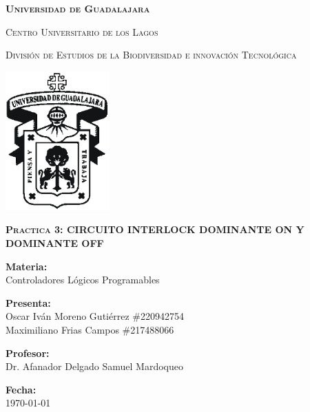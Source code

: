 \documentclass[12pt]{report}
\begin{document}
\setlength{\hoffset}{27 pt} %
\begin{titlepage}
{\centering
{\scshape\bfseries\fontsize{29.16}{34.992}\selectfont Universidad de Guadalajara \par}
\vspace{0.5cm}
{\scshape\Large Centro Universitario de los Lagos \par}
\vspace{1cm}
{\scshape\Large División de Estudios de la Biodiversidad e innovación Tecnológica \par}
\vspace{1cm}
{\graphicspath{{imagenes/Portada}} %
\includegraphics[width=0.3\textwidth]{image.png}\par}
\vspace{1cm}
{\scshape\large\bfseries Practica 3: CIRCUITO INTERLOCK
DOMINANTE ON Y DOMINANTE OFF \par}
\vspace{0.5cm}
{\large \textbf{Materia:} \\Controladores Lógicos Programables\par}
\vfill
{\large \textbf{Presenta:} \\Oscar Iván Moreno Gutiérrez \#220942754
\\Maximiliano Frias Campos \#217488066
\par}
\vfill
{\large \textbf{Profesor:} \\Dr. Afanador Delgado Samuel Mardoqueo \par}
\vfill
\vfill
\begin{flushright}
  {\normalsize \textbf {Fecha:} \\ \today}
\end{flushright}
\vfill}
{\large  \par}
\end{titlepage}
\end{document}
